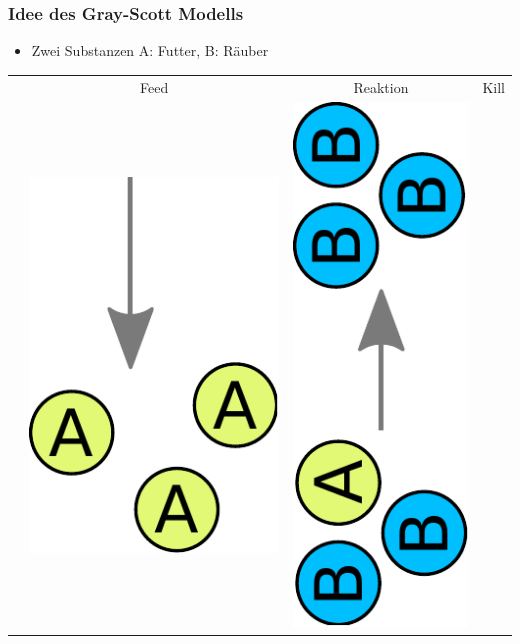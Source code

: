 \documentclass[12pt]{beamer}
\begin{document}
    \begin{frame}
      \frametitle{Idee des Gray-Scott Modells}
      \begin{itemize}
      \item Zwei Substanzen A: Futter, B: Räuber
      \renewcommand{\arraystretch}{0.1}
      \setlength{\tabcolsep}{0.2em} %
      \end{itemize}
      
      \begin{tabular}{ r c c c }
	  & Feed & Reaktion & Kill \\
	  &
      \includegraphics[scale=0.2]{Bilder/gs_feed.pdf}
	  &
      \includegraphics[scale=0.2,angle=-90,origin=l]{Bilder/gs_reaction.pdf}

\end{tabular}
\end{frame}
\end{document}
